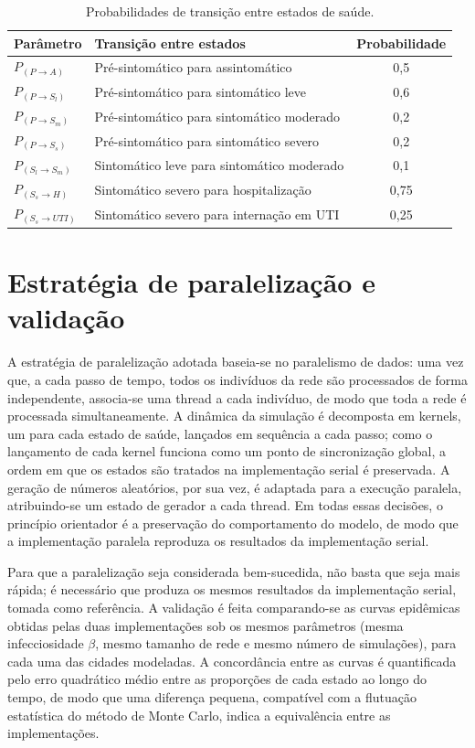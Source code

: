 \begin{table}[H]
\centering
\caption{Probabilidades de transição entre estados de saúde.}
\label{tab:prob}
\begin{tabular}{l l c}
\hline
\textbf{Parâmetro} & \textbf{Transição entre estados} & \textbf{Probabilidade} \\
\hline
$P_{(P\rightarrow A)}$    & Pré-sintomático para assintomático        & 0,5  \\
$P_{(P\rightarrow S_l)}$  & Pré-sintomático para sintomático leve     & 0,6  \\
$P_{(P\rightarrow S_m)}$  & Pré-sintomático para sintomático moderado & 0,2  \\
$P_{(P\rightarrow S_s)}$  & Pré-sintomático para sintomático severo   & 0,2  \\
$P_{(S_l\rightarrow S_m)}$ & Sintomático leve para sintomático moderado & 0,1 \\
$P_{(S_s\rightarrow H)}$   & Sintomático severo para hospitalização    & 0,75 \\
$P_{(S_s\rightarrow UTI)}$ & Sintomático severo para internação em UTI & 0,25 \\
\hline
\end{tabular}
\end{table}

\section{Estratégia de paralelização e validação}

A estratégia de paralelização adotada baseia-se no paralelismo de dados: uma vez que, a cada passo de tempo, todos os indivíduos da rede são processados de forma independente, associa-se uma thread a cada indivíduo, de modo que toda a rede é processada simultaneamente. A dinâmica da simulação é decomposta em kernels, um para cada estado de saúde, lançados em sequência a cada passo; como o lançamento de cada kernel funciona como um ponto de sincronização global, a ordem em que os estados são tratados na implementação serial é preservada. A geração de números aleatórios, por sua vez, é adaptada para a execução paralela, atribuindo-se um estado de gerador a cada thread. Em todas essas decisões, o princípio orientador é a preservação do comportamento do modelo, de modo que a implementação paralela reproduza os resultados da implementação serial.

Para que a paralelização seja considerada bem-sucedida, não basta que seja mais rápida; é necessário que produza os mesmos resultados da implementação serial, tomada como referência. A validação é feita comparando-se as curvas epidêmicas obtidas pelas duas implementações sob os mesmos parâmetros (mesma infecciosidade $\beta$, mesmo tamanho de rede e mesmo número de simulações), para cada uma das cidades modeladas. A concordância entre as curvas é quantificada pelo erro quadrático médio entre as proporções de cada estado ao longo do tempo, de modo que uma diferença pequena, compatível com a flutuação estatística do método de Monte Carlo, indica a equivalência entre as implementações.

